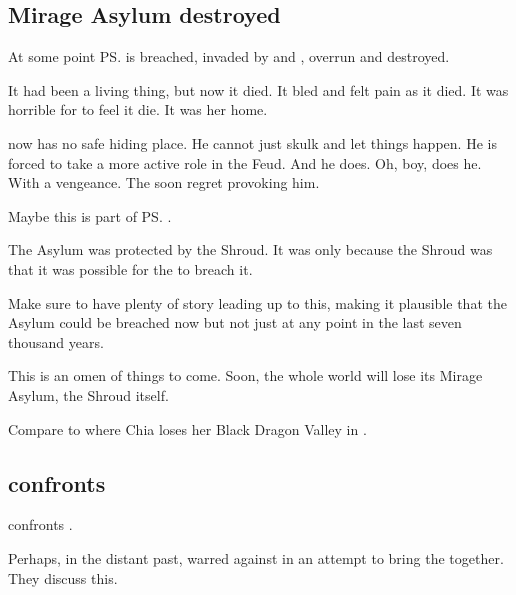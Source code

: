 \subsection{Mirage Asylum destroyed}
At some point \ps{\Ishnaruchaefir}  is breached, invaded by \resphain{} and \banes, overrun and destroyed.
 
It had been a living thing, but now it died. 
It bled and felt pain as it died. 
It was horrible for \Criseis to feel it die.
It was her home. 

\Ishnaruchaefir{} now has no safe hiding place. 
He cannot just skulk and let things happen. 
He is forced to take a more active role in the Feud. 
And he does. 
Oh, boy, does he. 
With a vengeance. 
The \resphain{} soon regret provoking him. 

Maybe this is part of \ps{\Azraid} . 

The Asylum was protected by the Shroud. 
It was only because the Shroud was  that it was possible for the \resphain{} to breach it. 

Make sure to have plenty of story leading up to this, making it plausible that the Asylum could be breached now but not just at any point in the last seven thousand years. 

This is an omen of things to come. 
Soon, the whole world will lose its Mirage Asylum, the Shroud itself. 

Compare to where Chia loses her Black Dragon Valley in . 







\subsection{\Ishnaruchaefir{} confronts \Secherdamon}
\Ishnaruchaefir{} confronts \Secherdamon.

Perhaps, in the distant past, \Ishnaruchaefir{} warred against \Nexagglachel{} in an attempt to bring the \dragons{} together. 
They discuss this.

